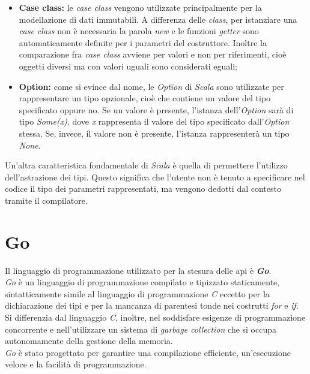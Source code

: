 \begin{itemize}
	\item{\textbf{Case class:} le \textit{case class} vengono utilizzate principalmente per la modellazione di dati immutabili. A differenza delle \textit{class}, per istanziare una \textit{case class} non è necessaria la parola \textit{new} e le funzioni \textit{getter} sono automaticamente definite per i parametri del costruttore. Inoltre la comparazione fra \textit{case class} avviene per valori e non per riferimenti, cioè oggetti diversi ma con valori uguali sono considerati eguali;}
	\item{\textbf{Option:} come si evince dal nome, le \textit{Option} di \textit{Scala} sono utilizzate per rappresentare un tipo opzionale, cioè che contiene un valore del tipo specificato oppure no. Se un valore è presente, l'istanza dell'\textit{Option} sarà di tipo \textit{Some(x)}, dove \textit{x} rappresenta il valore del tipo specificato dall'\textit{Option} stessa. Se, invece, il valore non è presente, l'istanza rappresenterà un tipo \textit{None}.}
\end{itemize}
Un'altra caratteristica fondamentale di \textit{Scala} è quella di permettere l'utilizzo dell'astrazione dei tipi. Questo significa che l'utente non è tenuto a specificare nel codice il tipo dei parametri rappresentati, ma vengono dedotti dal contesto tramite il compilatore.



\section{Go}\label{sec:go}
Il linguaggio di programmazione utilizzato per la stesura delle \gls{api} è \textbf{\textit{Go}}.\\
\textit{Go} è un linguaggio di programmazione compilato e tipizzato staticamente, sintatticamente simile al linguaggio di programmazione \textit{C} eccetto per la dichiarazione dei tipi e per la mancanza di parentesi tonde nei costrutti \textit{for} e \textit{if}. Si differenzia dal linguaggio \textit{C}, inoltre, nel soddisfare esigenze di programmazione concorrente e nell'utilizzare un sistema di \textit{garbage collection} che si occupa autonomamente della gestione della memoria.\\
\textit{Go} è stato progettato per garantire una compilazione efficiente, un'esecuzione veloce e la facilità di programmazione.

